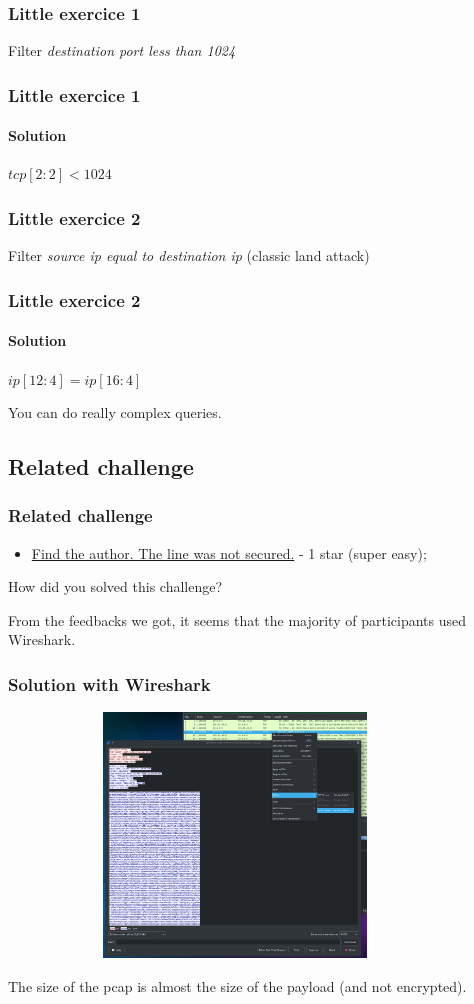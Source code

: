 \documentclass[]{beamer}
\begin{document}
\begin{frame}
\frametitle{Little exercice 1}
Filter \textit{destination port less than 1024}
\end{frame}

\begin{frame}
\frametitle{Little exercice 1}
\framesubtitle{Solution}
$tcp[2:2] < 1024$
\end{frame}



\begin{frame}
\frametitle{Little exercice 2}
Filter \textit{source ip equal to destination ip} (classic land attack)
\end{frame}

\begin{frame}
\frametitle{Little exercice 2}
\framesubtitle{Solution}
$ip[12:4] = ip[16:4]$

\vspace{3cm}
You can do really complex queries.
\end{frame}




\subsection{Related challenge}
\begin{frame}
\frametitle{Related challenge}
\begin{itemize}
\item \href{https://github.com/cscluxembourg/vestatech/blob/master/challenges/find-the-author/gift.cap}{Find the author. The line was not secured.} - 1 star (super easy);
\end{itemize}
\bigskip
How did you solved this challenge?

\bigskip
From the feedbacks we got, it seems that the majority of participants used Wireshark.
\end{frame}


\begin{frame}
\frametitle{Solution with Wireshark}
\begin{center}
    \includegraphics[height=6.5cm, width=12.0cm]{./images/Wireshark_follow_http_stream.png}
\end{center}
The size of the pcap is almost the size of the payload (and not encrypted).
\end{frame}
 
\end{document}
